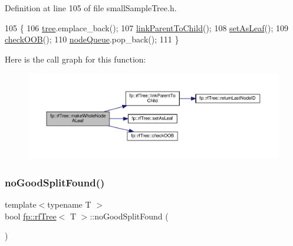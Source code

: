 Definition at line 105 of file small\+Sample\+Tree.\+h.


\begin{DoxyCode}
105                                                 \{
106                     \hyperlink{classfp_1_1rfTree_a1d5c209715f4044a85878c17e2b3ee53}{tree}.emplace\_back();
107                     \hyperlink{classfp_1_1rfTree_aceaedc5d54bb429c1a3539f164a93d45}{linkParentToChild}();
108                     \hyperlink{classfp_1_1rfTree_a3583e1f1659ba9a9013a4891709bacb9}{setAsLeaf}();
109                     \hyperlink{classfp_1_1rfTree_a45e47b318c90a1359840ab6161f20ab1}{checkOOB}();
110                     \hyperlink{classfp_1_1rfTree_af72d0a2f930fd480dfb4858885c2df23}{nodeQueue}.pop\_back();
111                 \}
\end{DoxyCode}
Here is the call graph for this function\+:
\nopagebreak
\begin{figure}[H]
\begin{center}
\leavevmode
\includegraphics[width=350pt]{classfp_1_1rfTree_a2b2a47186c0784415609f1c9b005e702_cgraph}
\end{center}
\end{figure}
\mbox{\label{classfp_1_1rfTree_a618bdc2d22267b4bb4f5e1881b1788f6}} 
\subsubsection{\texorpdfstring{no\+Good\+Split\+Found()}{noGoodSplitFound()}\hspace{0.1cm}{\footnotesize\ttfamily [1/2]}}
{\footnotesize\ttfamily template$<$typename T $>$ \\
bool \hyperlink{classfp_1_1rfTree}{fp\+::rf\+Tree}$<$ T $>$\+::no\+Good\+Split\+Found (\begin{DoxyParamCaption}{ }\end{DoxyParamCaption})\hspace{0.3cm}{\ttfamily [inline]}}




